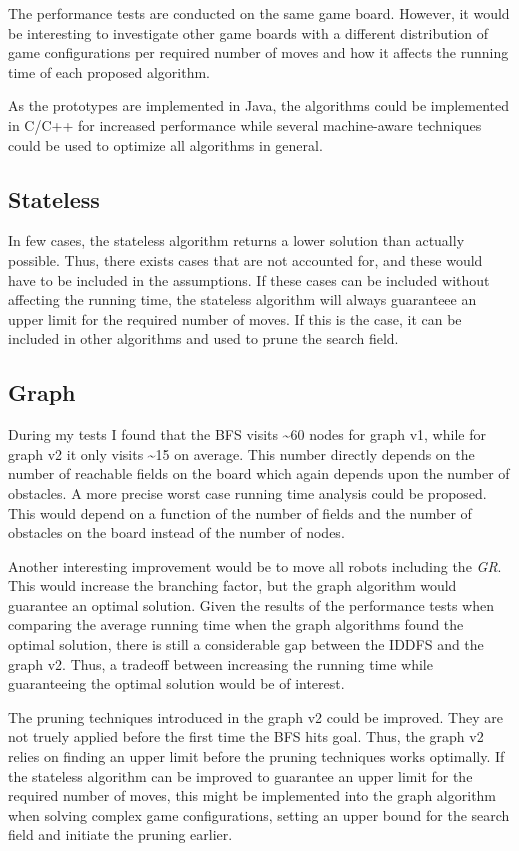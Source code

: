 \documentclass[]{article}
\begin{document}
The performance tests are conducted on the same game board. However, it
would be interesting to investigate other game boards with a different
distribution of game configurations per required number of moves and how
it affects the running time of each proposed algorithm.

As the prototypes are implemented in Java, the algorithms could be
implemented in C/C++ for increased performance while several
machine-aware techniques could be used to optimize all algorithms in
general.

\subsection{Stateless}\label{stateless-1}

In few cases, the stateless algorithm returns a lower solution than
actually possible. Thus, there exists cases that are not accounted for,
and these would have to be included in the assumptions. If these cases
can be included without affecting the running time, the stateless
algorithm will always guaranteee an upper limit for the required number
of moves. If this is the case, it can be included in other algorithms
and used to prune the search field.

\subsection{Graph}\label{graph}

During my tests I found that the BFS visits \textasciitilde{}60 nodes
for graph v1, while for graph v2 it only visits \textasciitilde{}15 on
average. This number directly depends on the number of reachable fields
on the board which again depends upon the number of obstacles. A more
precise worst case running time analysis could be proposed. This would
depend on a function of the number of fields and the number of obstacles
on the board instead of the number of nodes.

Another interesting improvement would be to move all robots including
the \emph{GR}. This would increase the branching factor, but the graph
algorithm would guarantee an optimal solution. Given the results of the
performance tests when comparing the average running time when the graph
algorithms found the optimal solution, there is still a considerable gap
between the IDDFS and the graph v2. Thus, a tradeoff between increasing
the running time while guaranteeing the optimal solution would be of
interest.

The pruning techniques introduced in the graph v2 could be improved.
They are not truely applied before the first time the BFS hits goal.
Thus, the graph v2 relies on finding an upper limit before the pruning
techniques works optimally. If the stateless algorithm can be improved
to guarantee an upper limit for the required number of moves, this might
be implemented into the graph algorithm when solving complex game
configurations, setting an upper bound for the search field and initiate
the pruning earlier.
\end{document}
